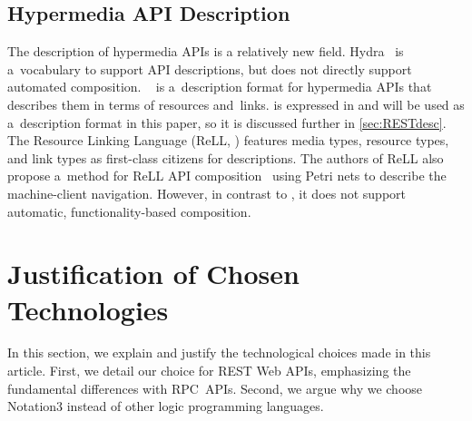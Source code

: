 \subsection{Hypermedia API Description}
The description of hypermedia APIs is a relatively new field.
Hydra~\cite{HydraVocabulary} is a~vocabulary to support API descriptions,
but does not directly support automated composition.
\restdesc~\cite{verborgh_wsrest_2012}
is a~description format
for hypermedia APIs that describes them in terms of resources and~links.
\restdesc is expressed in \nthree
and will be used as a~description format in this paper,
so it is discussed further in \cref{sec:RESTdesc}.
The Resource Linking Language (ReLL, \cite{ReLL}) features media types, resource types, and link types as first-class citizens for descriptions.
The authors of ReLL also propose a~method
for ReLL API composition~\cite{ReLLComposition}
using Petri nets to describe the machine-client navigation.
However, in contrast to \restdesc, it does not support
automatic, functionality-based composition.

% 
% 

\section{Justification of Chosen Technologies}
\label{sec:Technologies}
In this section, we explain and justify the technological choices made in this article.
First, we detail our choice for REST Web APIs, emphasizing the fundamental differences with RPC~APIs.
Second, we argue why we choose Notation3 instead of other logic programming languages.


